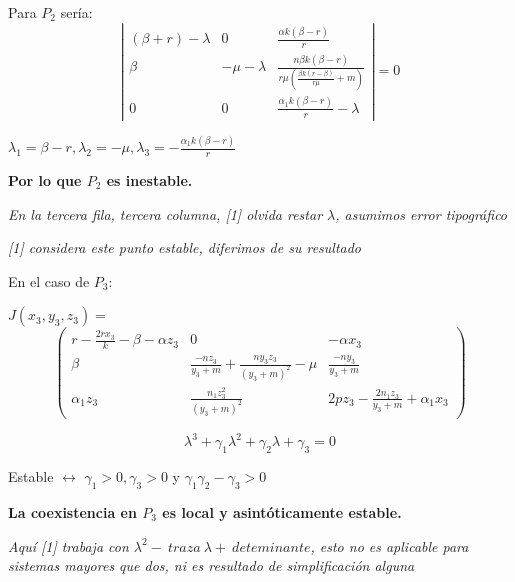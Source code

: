 \documentclass{beamer}
\begin{document}
\begin{frame}
    Para $P_2$ sería:
    $$\left|
        \begin{array}{ccc}
            (\beta+r)-\lambda & 0            & \frac{\alpha k(\beta-r)}{r}                                      \\
            \beta             & -\mu-\lambda & \frac{n\beta k(\beta-r)}{r\mu (\frac{\beta k(r-\beta)}{r\mu}+m)} \\
            0                 & 0            & \frac{\alpha_1 k(\beta-r)}{r}-\lambda
        \end{array}
        \right| =0$$

    $\lambda_1=\beta-r, \lambda_2=-\mu, \lambda_3=-\frac{\alpha_1 k(\beta-r)}{r}$

    {\bf Por lo que $P_2$ es inestable.}
    \vspace*{0.7cm}

    {\it\scriptsize En la tercera fila, tercera columna, [1] olvida restar $\lambda$, asumimos error tipográfico}

    {\it\scriptsize [1] considera este punto estable, diferimos de su resultado}

\end{frame}
\begin{frame}

    En el caso de $P_3$:
    \vspace*{0.5cm}

    $J(x_3, y_3, z_3) =$
    $$
        \left(
        \begin{array}{ccc}
                r-\frac{2rx_3}{k}-\beta-\alpha z_3 & 0                                                 & -\alpha x_3                             \\
                \beta                              & \frac{-nz_3}{y_3+m}+\frac{ny_3z_3}{(y_3+m)^2}-\mu & \frac{-ny_3}{y_3+m}                     \\
                \alpha_1z_3                        & \frac{n_1z_3^2}{(y_3+m)^2}                        & 2pz_3-\frac{2n_1z_3}{y_3+m}+\alpha_1x_3
            \end{array}
        \right)$$
\end{frame}
\begin{frame}
    $$\lambda^3+\gamma_1\lambda^2+\gamma_2\lambda+\gamma_3=0 $$

    Estable $\leftrightarrow$ $\gamma_1>0, \gamma_3>0$ y $\gamma_1\gamma_2-\gamma_3>0$
    \vspace*{0.3cm}

    {\bf La coexistencia en $P_3$ es local y asintóticamente estable.}
    \vspace*{0.3cm}

    {\it \scriptsize Aquí [1] trabaja con $\lambda^2-\ traza\ \lambda+\ deteminante$, esto no es aplicable para sistemas mayores que dos, ni
    es resultado de simplificación alguna}
\end{frame}
\end{document}
